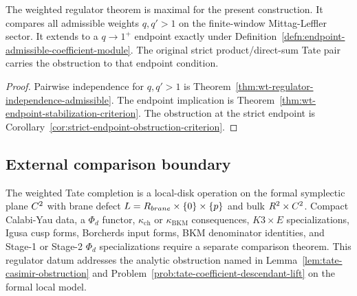 \begin{cor}\label{cor:wt-regulator-maximality}
  The weighted regulator theorem is maximal for the present
  construction.  It compares all admissible weights \(q,q'>1\) on the
  finite-window Mittag-Leffler sector.  It extends to a \(q\to1^+\)
  endpoint exactly under
  Definition~\ref{defn:endpoint-admissible-coefficient-module}.  The
  original strict product/direct-sum Tate pair carries the obstruction to
  that endpoint condition.
\end{cor}

\begin{proof}
  Pairwise independence for \(q,q'>1\) is
  Theorem~\ref{thm:wt-regulator-independence-admissible}.  The endpoint
  implication is
  Theorem~\ref{thm:wt-endpoint-stabilization-criterion}.  The obstruction
  at the strict endpoint is
  Corollary~\ref{cor:strict-endpoint-obstruction-criterion}.
\end{proof}

\subsection*{External comparison boundary}

\begin{rmk}\label{rmk:wt-no-transfer-vol3}
  The weighted Tate completion is a local-disk operation on the
  formal symplectic plane $C^2$ with brane defect
  \(L=R_{brane}\times\{0\}\times\{p\}\) and
  bulk $R^2\times C^2$. Compact Calabi-Yau data, a $\Phi_d$ functor,
  \(\kappa_{\mathrm{ch}}\) or \(\kappa_{\mathrm{BKM}}\) consequences,
  \(K3\times E\) specializations, Igusa cusp forms, Borcherds input
  forms, BKM denominator identities, and Stage-1 or Stage-2
  \(\Phi_d\) specializations require a separate comparison theorem.
  This regulator datum addresses the analytic obstruction named in
  Lemma~\ref{lem:tate-casimir-obstruction} and
  Problem~\ref{prob:tate-coefficient-descendant-lift} on the formal
  local model.
\end{rmk}

